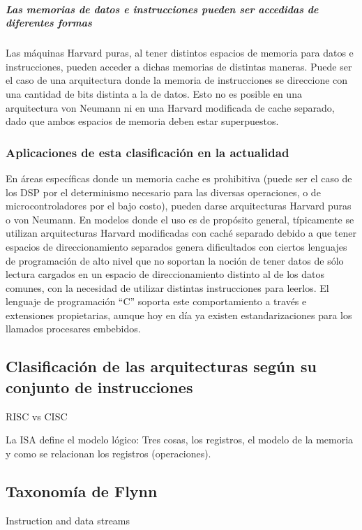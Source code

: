 \subparagraph{Las memorias de datos e instrucciones pueden ser accedidas de diferentes formas}

Las máquinas Harvard puras, al tener distintos espacios de memoria para datos e instrucciones, pueden acceder a dichas memorias de distintas maneras. Puede ser el caso de una arquitectura donde la memoria de instrucciones se direccione con una cantidad de bits distinta a la de datos. Esto no es posible en una arquitectura von Neumann ni en una Harvard modificada de cache separado, dado que ambos espacios de memoria deben estar superpuestos.

\subsubsection{Aplicaciones de esta clasificación en la actualidad}

En áreas específicas donde un memoria cache es prohibitiva (puede ser el caso de los DSP por el determinismo necesario para las diversas operaciones, o de microcontroladores por el bajo costo), pueden darse arquitecturas Harvard puras o von Neumann. En modelos donde el uso es de propósito general, típicamente se utilizan arquitecturas Harvard modificadas con caché separado debido a que tener espacios de direccionamiento separados genera dificultados con ciertos lenguajes de programación de alto nivel que no soportan la noción de tener datos de sólo lectura cargados en un espacio de direccionamiento distinto al de los datos comunes, con la necesidad de utilizar distintas instrucciones para leerlos. El lenguaje de programación ``C'' soporta este comportamiento a través e extensiones propietarias, aunque hoy en día ya existen estandarizaciones para los llamados procesares embebidos.

\subsection{Clasificación de las arquitecturas según su conjunto de instrucciones}

RISC vs CISC

La ISA define el modelo lógico: Tres cosas, los registros, el modelo de la memoria y como se relacionan los registros (operaciones).

\subsection{Taxonomía de Flynn}

Instruction and data streams


